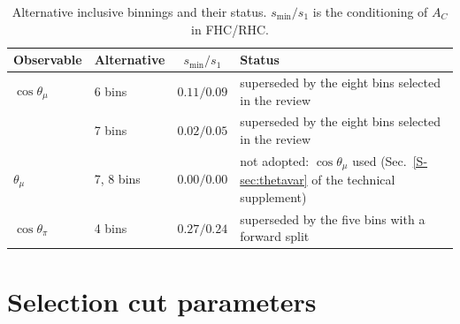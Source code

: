 \documentclass[11pt,a4paper]{article}
\newcommand{\suppref}[2]{#1~\ref{S-#2} of the technical supplement}
\begin{document}
\begin{table}[H]
  \centering
  \caption{Alternative inclusive binnings and their status. $s_{\min}/s_1$ is the conditioning of
    $A_C$ in FHC/RHC.}
  \label{tab:altbinning}
  \footnotesize
  \begin{tabular}{llcp{6.0cm}}
    \toprule
    Observable & Alternative & $s_{\min}/s_1$ & Status \\
    \midrule
    $\cos\theta_\mu$ & 6 bins & $0.11/0.09$ & superseded by the eight bins selected in the review \\
                     & 7 bins & $0.02/0.05$ & superseded by the eight bins selected in the review \\
    $\theta_\mu$ & 7, 8 bins & $0.00/0.00$ & not adopted: $\cos\theta_\mu$ used (\suppref{Sec.}{sec:thetavar}) \\
    $\cos\theta_\pi$ & 4 bins & $0.27/0.24$ & superseded by the five bins with a forward split \\
    \bottomrule
  \end{tabular}
\end{table}



\section{Selection cut parameters}
\label{app:cutparams}
\end{document}
